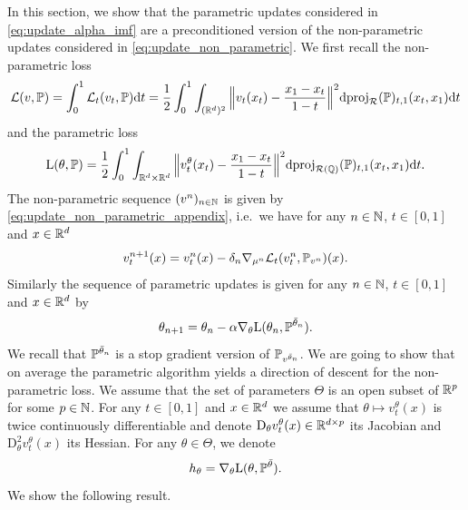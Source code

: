 \documentclass{article}
\begin{document}
In this section, we show that the parametric updates considered in \eqref{eq:update_alpha_imf} are a preconditioned version of the non-parametric updates considered in \eqref{eq:update_non_parametric}. We first recall the non-parametric loss 
\begin{equation}
\label{eq:loss_function_appendix}
    \Lnonparam(v, \Pbb) = \int_0^1 \Lnonparam_t(v_t, \Pbb) \rmd t = \frac{1}{2} \int_0^1 \int_{(\rset^d)^2}\Big\|  v_t(x_t) - \frac{x_1 - x_t}{1 - t} \Big\| ^2 \rmd \projsimpleR(\Pbb)_{t,1}(x_t,x_1) \rmd t 
\end{equation}
and the parametric loss
\begin{equation}
\label{eq:update_alpha_imf_appendix}
     \Lparam(\theta, \Pbb) = \frac{1}{2} \int_0^1 \int_{\rset^d \times \rset^d} \Big\|  v_t^\theta(x_t) - \frac{x_1 - x_t}{1 - t} \Big\| ^2 \rmd \projR{\Qbb}(\Pbb)_{t,1}(x_t, x_1) \rmd t.
\end{equation}
The non-parametric sequence $(v^n)_{n \in \mathbb{N}}$ is given by \eqref{eq:update_non_parametric_appendix}, i.e.~we have for any $n \in \mathbb{N}$, $t  \in [0,1]$ and $x \in \mathbb{R}^d$
\begin{equation}
\label{eq:update_non_parametric_appendix}
    v^{n+1}_t(x) = v^n_t(x) - \delta_n \nabla_{\mu^n} \Lnonparam_t(v^n_t, \Pbb_{v^n})(x).
\end{equation}
Similarly the sequence of parametric updates is given for any $n \in \mathbb{N}$, $t \in [0,1]$ and $x \in \mathbb{R}^d$ by 
\begin{equation}
    \theta_{n+1} = \theta_n - \alpha \nabla_\theta \mathrm{L}(\theta_n, \mathbb{P}^{\bar{\theta}_n}) . 
\end{equation}
We recall that $\mathbb{P}^{\bar{\theta}_n}$ is a stop gradient version of $\mathbb{P}_{v^{\bar{\theta}_n}}$. 
We are going to show that on average the parametric algorithm yields a direction of descent for the non-parametric loss. We assume that the set of parameters $\Theta$ is an open subset of $\mathbb{R}^p$ for some $p \in \mathbb{N}$. For any $t \in [0,1]$ and $x \in \mathbb{R}^d$ we assume that $\theta \mapsto v^\theta_t(x)$ is twice continuously differentiable and denote $\mathrm{D}_\theta v^\theta_t(x) \in \mathbb{R}^{d \times p}$ its Jacobian and $\mathrm{D}_\theta^2 v^\theta_t(x)$ its Hessian.  
For any $\theta \in \Theta$, we denote 
\begin{equation}
    h_\theta = \nabla_\theta \mathrm{L}(\theta, \mathbb{P}^{\bar{\theta}}) .
\end{equation}
We show the following result. 
\end{document}
